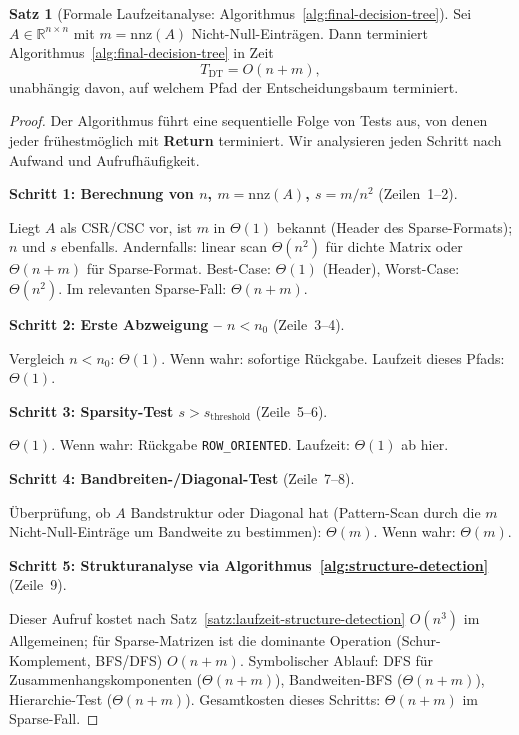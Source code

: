\documentclass[a4paper,12pt]{report}
\theoremstyle{definition}
\newtheorem{satz}{Satz}
\begin{document}
	\begin{satz}[Formale Laufzeitanalyse: Algorithmus~\ref{alg:final-decision-tree}]
		\label{satz:laufzeit-decision-tree}
		Sei $A \in \mathbb{R}^{n \times n}$ mit $m = \mathrm{nnz}(A)$ Nicht-Null-Einträgen. Dann terminiert Algorithmus~\ref{alg:final-decision-tree} in Zeit
		\[
			T_{\mathrm{DT}} = O(n + m),
		\]
		unabhängig davon, auf welchem Pfad der Entscheidungsbaum terminiert.
	\end{satz}
	\begin{proof}
		Der Algorithmus führt eine sequentielle Folge von Tests aus, von denen jeder frühestmöglich mit \textbf{Return} terminiert. Wir analysieren jeden Schritt nach Aufwand und Aufrufhäufigkeit.

		\textbf{Schritt 1: Berechnung von $n$, $m = \mathrm{nnz}(A)$, $s = m/n^2$} (Zeilen~1--2).

		Liegt $A$ als CSR/CSC vor, ist $m$ in $\Theta(1)$ bekannt (Header des Sparse-Formats); $n$ und $s$ ebenfalls. Andernfalls: linear scan $\Theta(n^2)$ für dichte Matrix oder $\Theta(n + m)$ für Sparse-Format. Best-Case: $\Theta(1)$ (Header), Worst-Case: $\Theta(n^2)$. Im relevanten Sparse-Fall: $\Theta(n + m)$.

		\textbf{Schritt 2: Erste Abzweigung -- $n < n_0$} (Zeile~3--4).

		Vergleich $n < n_0$: $\Theta(1)$. Wenn wahr: sofortige Rückgabe. Laufzeit dieses Pfads: $\Theta(1)$.

		\textbf{Schritt 3: Sparsity-Test $s > s_{\mathrm{threshold}}$} (Zeile~5--6).

		$\Theta(1)$. Wenn wahr: Rückgabe \texttt{ROW\_ORIENTED}. Laufzeit: $\Theta(1)$ ab hier.

		\textbf{Schritt 4: Bandbreiten-/Diagonal-Test} (Zeile~7--8).

		Überprüfung, ob $A$ Bandstruktur oder Diagonal hat (Pattern-Scan durch die $m$ Nicht-Null-Einträge um Bandweite zu bestimmen): $\Theta(m)$. Wenn wahr: $\Theta(m)$.

		\textbf{Schritt 5: Strukturanalyse via Algorithmus~\ref{alg:structure-detection}} (Zeile~9).

		Dieser Aufruf kostet nach Satz~\ref{satz:laufzeit-structure-detection} $O(n^3)$ im Allgemeinen; für Sparse-Matrizen ist die dominante Operation (Schur-Komplement, BFS/DFS) $O(n + m)$. Symbolischer Ablauf: DFS für Zusammenhangskomponenten ($\Theta(n + m)$), Bandweiten-BFS ($\Theta(n + m)$), Hierarchie-Test ($\Theta(n + m)$). Gesamtkosten dieses Schritts: $\Theta(n + m)$ im Sparse-Fall.


\end{proof}
\end{document}
